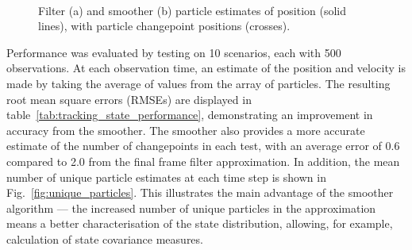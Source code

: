 \documentclass[journal]{IEEEtran}
\begin{document}
\begin{figure}[!t]
\centering
{} \\
\caption{Filter (a) and smoother (b) particle estimates of position (solid lines), with particle changepoint positions (crosses). }
\label{fig:2D_particle_results}
\end{figure}

Performance was evaluated by testing on 10 scenarios, each with 500 observations. At each observation time, an estimate of the position and velocity is made by taking the average of values from the array of particles. The resulting root mean square errors (RMSEs) are displayed in table~\ref{tab:tracking_state_performance}, demonstrating an improvement in accuracy from the smoother. The smoother also provides a more accurate estimate of the number of changepoints in each test, with an average error of 0.6 compared to 2.0 from the final frame filter approximation. In addition, the mean number of unique particle estimates at each time step is shown in Fig.~\ref{fig:unique_particles}. This illustrates the main advantage of the smoother algorithm --- the increased number of unique particles in the approximation means a better characterisation of the state distribution, allowing, for example, calculation of state covariance measures.
\end{document}
